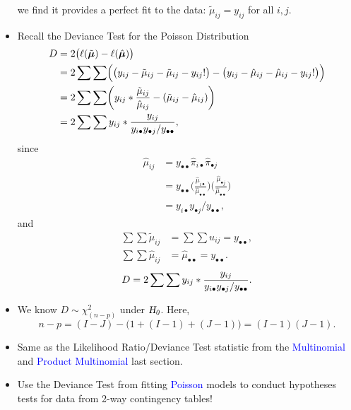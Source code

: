 \documentclass{article}\usepackage[]{graphicx}\usepackage[svgnames]{xcolor}
\let\log\relax%
\newcommand{\HN}{\textsl{H}_{\textsl{0}}}%
\providecommand{\Vector}[1]{\bm{#1}}%
\begin{document}
\begin{itemize}
            we find it provides a perfect fit to the data: $ \tilde{\mu}_{ij}=y_{ij} $ for all $ i,j $.
      \item Recall the Deviance Test for the Poisson Distribution
            \begin{align*}
                  D
                   & =2\bigl(\ell(\tilde{\Vector{\mu}})-\ell(\hat{\Vector{\mu}})\bigr)                                                                                                   \\
                   & =2\sum\sum\Bigl(\bigl(y_{ij}-\log{\tilde{\mu}_{ij}}-\tilde{\mu}_{ij}-\log{y_{ij}!}\bigr)-\bigl(y_{ij}-\log{\hat{\mu}_{ij}}-\hat{\mu}_{ij}-\log{y_{ij}!}\bigr)\Bigr) \\
                   & =2\sum\sum\biggl(y_{ij}\log*{\frac{\tilde{\mu}_{ij}}{\hat{\mu}_{ij}}}-(\tilde{\mu}_{ij}-\hat{\mu}_{ij})\biggr)                                                      \\
                   & =2\sum\sum y_{ij}\log*{\frac{y_{ij}}{y_{i\bullet}y_{\bullet j}/y_{\bullet\bullet}}},
            \end{align*}
            since
            \begin{align*}
                  \hat{\mu}_{ij}
                   & =y_{\bullet\bullet}\hat{\pi}_{i\bullet}\hat{\pi}_{\bullet j}                                                                                                   \\
                   & =y_{\bullet\bullet}\biggl(\frac{\hat{\mu}_{i\bullet}}{\hat{\mu}_{\bullet\bullet}}\biggr)\biggl(\frac{\hat{\mu}_{\bullet j}}{\hat{\mu}_{\bullet\bullet}}\biggr) \\
                   & =y_{i\bullet}y_{\bullet j}/y_{\bullet\bullet},
            \end{align*}
            and
            \begin{align*}
                  \sum\sum\tilde{\mu}_{ij} & =\sum\sum u_{ij}=y_{\bullet\bullet},            \\
                  \sum\sum\hat{\mu}_{ij}   & =\hat{\mu}_{\bullet\bullet}=y_{\bullet\bullet}.
            \end{align*}
            \[ D=2\sum\sum y_{ij}\log*{\frac{y_{ij}}{y_{i\bullet}y_{\bullet j}/y_{\bullet\bullet}}}. \]
      \item We know $ D \sim \chi^2_{(n-p)} $ under $ \HN $. Here,
            \[ n-p=(I-J)-\bigl(1+(I-1)+(J-1)\bigr)=(I-1)(J-1). \]
      \item Same as the Likelihood Ratio/Deviance Test statistic from the \textcolor{Blue}{Multinomial} and
            \textcolor{Blue}{Product Multinomial} last section.
      \item Use the Deviance Test from fitting \textcolor{Blue}{Poisson} models to conduct hypotheses tests
            for data from 2-way contingency tables!
\end{itemize}
\end{document}
